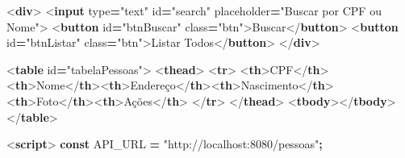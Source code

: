 \documentclass[
]{book}
\newenvironment{Shaded}{\begin{snugshade}}{\end{snugshade}}
\newcommand{\DataTypeTok}[1]{\textcolor[rgb]{0.13,0.29,0.53}{#1}}
\newcommand{\KeywordTok}[1]{\textcolor[rgb]{0.13,0.29,0.53}{\textbf{#1}}}
\newcommand{\NormalTok}[1]{#1}
\newcommand{\OperatorTok}[1]{\textcolor[rgb]{0.81,0.36,0.00}{\textbf{#1}}}
\newcommand{\OtherTok}[1]{\textcolor[rgb]{0.56,0.35,0.01}{#1}}
\newcommand{\StringTok}[1]{\textcolor[rgb]{0.31,0.60,0.02}{#1}}
\begin{document}
\begin{Shaded}
\begin{Highlighting}[]
\DataTypeTok{\textless{}}\KeywordTok{div}\DataTypeTok{\textgreater{}}
  \DataTypeTok{\textless{}}\KeywordTok{input}\OtherTok{ type}\OperatorTok{=}\StringTok{"text"}\OtherTok{ id}\OperatorTok{=}\StringTok{"search"}\OtherTok{ placeholder}\OperatorTok{=}\StringTok{"Buscar por CPF ou Nome"}\DataTypeTok{\textgreater{}}
  \DataTypeTok{\textless{}}\KeywordTok{button}\OtherTok{ id}\OperatorTok{=}\StringTok{"btnBuscar"}\OtherTok{ class}\OperatorTok{=}\StringTok{"btn"}\DataTypeTok{\textgreater{}}\NormalTok{Buscar}\DataTypeTok{\textless{}/}\KeywordTok{button}\DataTypeTok{\textgreater{}}
  \DataTypeTok{\textless{}}\KeywordTok{button}\OtherTok{ id}\OperatorTok{=}\StringTok{"btnListar"}\OtherTok{ class}\OperatorTok{=}\StringTok{"btn"}\DataTypeTok{\textgreater{}}\NormalTok{Listar Todos}\DataTypeTok{\textless{}/}\KeywordTok{button}\DataTypeTok{\textgreater{}}
\DataTypeTok{\textless{}/}\KeywordTok{div}\DataTypeTok{\textgreater{}}

\DataTypeTok{\textless{}}\KeywordTok{table}\OtherTok{ id}\OperatorTok{=}\StringTok{"tabelaPessoas"}\DataTypeTok{\textgreater{}}
  \DataTypeTok{\textless{}}\KeywordTok{thead}\DataTypeTok{\textgreater{}}
    \DataTypeTok{\textless{}}\KeywordTok{tr}\DataTypeTok{\textgreater{}}
      \DataTypeTok{\textless{}}\KeywordTok{th}\DataTypeTok{\textgreater{}}\NormalTok{CPF}\DataTypeTok{\textless{}/}\KeywordTok{th}\DataTypeTok{\textgreater{}\textless{}}\KeywordTok{th}\DataTypeTok{\textgreater{}}\NormalTok{Nome}\DataTypeTok{\textless{}/}\KeywordTok{th}\DataTypeTok{\textgreater{}\textless{}}\KeywordTok{th}\DataTypeTok{\textgreater{}}\NormalTok{Endereço}\DataTypeTok{\textless{}/}\KeywordTok{th}\DataTypeTok{\textgreater{}\textless{}}\KeywordTok{th}\DataTypeTok{\textgreater{}}\NormalTok{Nascimento}\DataTypeTok{\textless{}/}\KeywordTok{th}\DataTypeTok{\textgreater{}\textless{}}\KeywordTok{th}\DataTypeTok{\textgreater{}}\NormalTok{Foto}\DataTypeTok{\textless{}/}\KeywordTok{th}\DataTypeTok{\textgreater{}\textless{}}\KeywordTok{th}\DataTypeTok{\textgreater{}}\NormalTok{Ações}\DataTypeTok{\textless{}/}\KeywordTok{th}\DataTypeTok{\textgreater{}}
    \DataTypeTok{\textless{}/}\KeywordTok{tr}\DataTypeTok{\textgreater{}}
  \DataTypeTok{\textless{}/}\KeywordTok{thead}\DataTypeTok{\textgreater{}}
  \DataTypeTok{\textless{}}\KeywordTok{tbody}\DataTypeTok{\textgreater{}\textless{}/}\KeywordTok{tbody}\DataTypeTok{\textgreater{}}
\DataTypeTok{\textless{}/}\KeywordTok{table}\DataTypeTok{\textgreater{}}

\DataTypeTok{\textless{}}\KeywordTok{script}\DataTypeTok{\textgreater{}}
\KeywordTok{const}\NormalTok{ API\_URL }\OperatorTok{=} \StringTok{"http://localhost:8080/pessoas"}\OperatorTok{;}


\end{Highlighting}
\end{Shaded}
\end{document}
